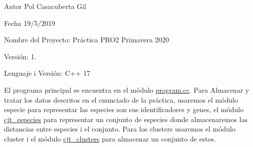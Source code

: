 \begin{DoxyAuthor}{Autor}
Pol Casacuberta Gil 
\end{DoxyAuthor}
\begin{DoxyDate}{Fecha}
19/5/2019
\end{DoxyDate}
Nombre del Proyecto\+: Práctica P\+R\+O2 Primavera 2020

Versión\+: 1.

Lenguaje i Versión\+: C++ 17

El programa principal se encuentra en el módulo \mbox{\hyperlink{program_8cc}{program.\+cc}}. Para Almacenar y tratar los datos descritos en el enunciado de la práctica, usaremos el módulo especie para representar las especies son sus identificadores y genes, el módulo \mbox{\hyperlink{classcjt__especies}{cjt\+\_\+especies}} para representar un conjunto de especies donde almacenaremos las distancias entre especies i el conjunto. Para los clusters usaremos el módulo cluster i el módulo \mbox{\hyperlink{classcjt__clusters}{cjt\+\_\+clusters}} para almacenar un conjunto de estos. 